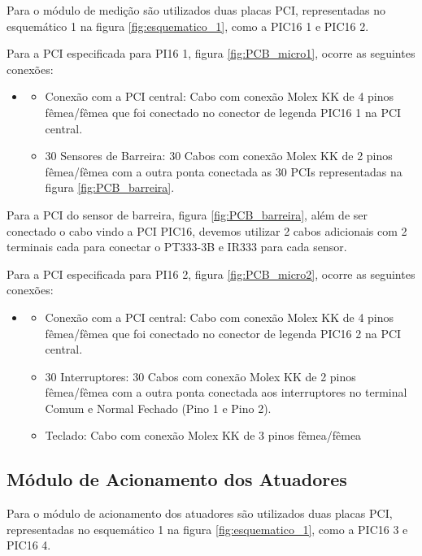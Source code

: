 Para o módulo de medição são utilizados duas placas PCI, representadas no esquemático 1 na figura \ref{fig:esquematico_1}, como a PIC16 1 e PIC16 2.

Para a PCI especificada para PI16 1, figura \ref{fig:PCB_micro1}, ocorre as seguintes conexões:

\begin{itemize}
    \item[]
    \begin{itemize}
    \item Conexão com a PCI central: Cabo com conexão Molex KK de 4 pinos fêmea/fêmea que foi conectado no conector de legenda PIC16 1 na PCI central.
    \item 30 Sensores de Barreira: 30 Cabos com conexão Molex KK de 2 pinos fêmea/fêmea com a outra ponta conectada as 30 PCIs representadas na figura \ref{fig:PCB_barreira}.
\end{itemize}
    
\end{itemize}


Para a PCI do sensor de barreira, figura \ref{fig:PCB_barreira}, além de ser conectado o cabo vindo a PCI PIC16, devemos utilizar 2 cabos adicionais com 2 terminais cada para conectar o PT333-3B e IR333 para cada sensor. 

Para a PCI especificada para PI16 2, figura \ref{fig:PCB_micro2}, ocorre as seguintes conexões:

\begin{itemize}
    \item[]
    \begin{itemize}
    \item Conexão com a PCI central: Cabo com conexão Molex KK de 4 pinos fêmea/fêmea que foi conectado no conector de legenda PIC16 2 na PCI central.
    \item 30 Interruptores: 30 Cabos com conexão Molex KK de 2 pinos fêmea/fêmea com a outra ponta conectada aos interruptores no terminal Comum e Normal Fechado (Pino 1 e Pino 2).
    \item Teclado: Cabo com conexão Molex KK de 3 pinos fêmea/fêmea
\end{itemize}
\end{itemize}


\subsection{Módulo de Acionamento dos Atuadores}

Para o módulo de acionamento dos atuadores são utilizados duas placas PCI, representadas no esquemático 1 na figura \ref{fig:esquematico_1}, como a PIC16 3 e PIC16 4.

